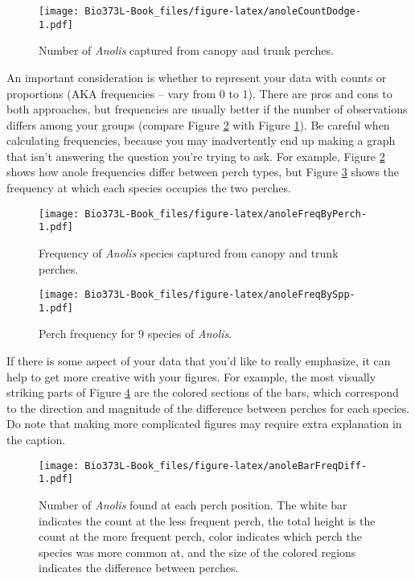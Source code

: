 \documentclass[]{book}
\begin{document}
\begin{figure}
\centering
\texttt{[image: Bio373L-Book\_files/figure-latex/anoleCountDodge-1.pdf]}
\caption{\label{fig:anoleCountDodge}Number of \emph{Anolis} captured from canopy and
trunk perches.}
\end{figure}

An important consideration is whether to represent your data with counts
or proportions (AKA frequencies -- vary from 0 to 1). There are pros and
cons to both approaches, but frequencies are usually better if the
number of observations differs among your groups (compare Figure
\ref{fig:anoleFreqByPerch} with Figure \ref{fig:anoleCountDodge}). Be
careful when calculating frequencies, because you may inadvertently end
up making a graph that isn't answering the question you're trying to
ask. For example, Figure \ref{fig:anoleFreqByPerch} shows how anole
frequencies differ between perch types, but Figure
\ref{fig:anoleFreqBySpp} shows the frequency at which each species
occupies the two perches.




\begin{figure}
\centering
\texttt{[image: Bio373L-Book\_files/figure-latex/anoleFreqByPerch-1.pdf]}
\caption{\label{fig:anoleFreqByPerch}Frequency of \emph{Anolis} species captured from
canopy and trunk perches.}
\end{figure}



\begin{figure}
\centering
\texttt{[image: Bio373L-Book\_files/figure-latex/anoleFreqBySpp-1.pdf]}
\caption{\label{fig:anoleFreqBySpp}Perch frequency for 9 species of \emph{Anolis}.}
\end{figure}

If there is some aspect of your data that you'd like to really
emphasize, it can help to get more creative with your figures. For
example, the most visually striking parts of Figure
\ref{fig:anoleBarFreqDiff} are the colored sections of the bars, which
correspond to the direction and magnitude of the difference between
perches for each species. Do note that making more complicated figures
may require extra explanation in the caption.







\begin{figure}
\centering
\texttt{[image: Bio373L-Book\_files/figure-latex/anoleBarFreqDiff-1.pdf]}
\caption{\label{fig:anoleBarFreqDiff}Number of \emph{Anolis} found at each perch position.
The white bar indicates the count at the less frequent perch, the total
height is the count at the more frequent perch, color indicates which
perch the species was more common at, and the size of the colored
regions indicates the difference between perches.}
\end{figure}
\end{document}

